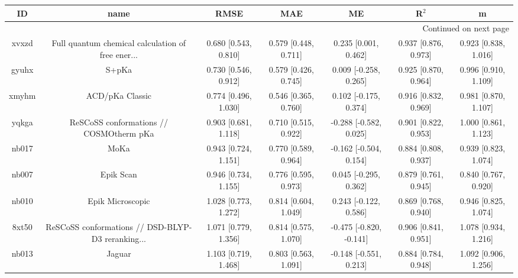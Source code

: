 \documentclass{article}
\begin{document}
\begin{center}
\begin{longtable}{|ccccccc|}
\toprule
    ID &                                               name &                  RMSE &                   MAE &                       ME &                 R$^2$ &                      m \\
\midrule
\endhead
\midrule
\multicolumn{7}{r}{{Continued on next page}} \\
\midrule
\endfoot

\bottomrule
\endlastfoot
 xvxzd &  Full quantum chemical calculation of free ener... &  0.680 [0.543, 0.810] &  0.579 [0.448, 0.711] &     0.235 [0.001, 0.462] &  0.937 [0.876, 0.973] &   0.923 [0.838, 1.016] \\
 gyuhx &                                              S+pKa &  0.730 [0.546, 0.912] &  0.579 [0.426, 0.745] &    0.009 [-0.258, 0.265] &  0.925 [0.870, 0.964] &   0.996 [0.910, 1.109] \\
 xmyhm &                                    ACD/pKa Classic &  0.774 [0.496, 1.030] &  0.546 [0.365, 0.760] &    0.102 [-0.175, 0.374] &  0.916 [0.832, 0.969] &   0.981 [0.870, 1.107] \\
 yqkga &            ReSCoSS conformations // COSMOtherm pKa &  0.903 [0.681, 1.118] &  0.710 [0.515, 0.922] &   -0.288 [-0.582, 0.025] &  0.901 [0.822, 0.953] &   1.000 [0.861, 1.123] \\
 nb017 &                                               MoKa &  0.943 [0.724, 1.151] &  0.770 [0.589, 0.964] &   -0.162 [-0.504, 0.154] &  0.884 [0.808, 0.937] &   0.939 [0.823, 1.074] \\
 nb007 &                                          Epik Scan &  0.946 [0.734, 1.155] &  0.776 [0.595, 0.973] &    0.045 [-0.295, 0.362] &  0.879 [0.761, 0.945] &   0.840 [0.767, 0.920] \\
 nb010 &                                   Epik Microscopic &  1.028 [0.773, 1.272] &  0.814 [0.604, 1.049] &    0.243 [-0.122, 0.586] &  0.869 [0.768, 0.940] &   0.946 [0.825, 1.074] \\
 8xt50 &  ReSCoSS conformations // DSD-BLYP-D3 reranking... &  1.071 [0.779, 1.356] &  0.814 [0.575, 1.070] &  -0.475 [-0.820, -0.141] &  0.906 [0.841, 0.951] &   1.078 [0.934, 1.216] \\
 nb013 &                                             Jaguar &  1.103 [0.719, 1.468] &  0.803 [0.563, 1.091] &   -0.148 [-0.551, 0.213] &  0.884 [0.784, 0.948] &   1.092 [0.906, 1.256] \\

\end{longtable}
\end{center}
\end{document}
